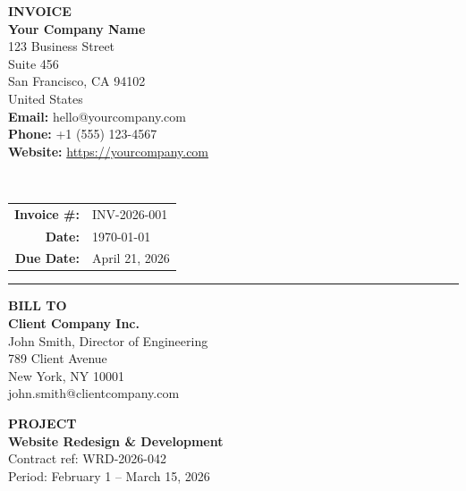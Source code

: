\documentclass[11pt,a4paper]{article}
\newcommand{\sectionline}{\vspace{4pt}\noindent\rule{\textwidth}{0.5pt}\vspace{4pt}}
\begin{document}
\begin{minipage}[t]{0.55\textwidth}
    {\Huge\textbf{\textcolor{accentblue}{INVOICE}}}\\[12pt]
    {\large\textbf{Your Company Name}}\\
    123 Business Street\\
    Suite 456\\
    San Francisco, CA 94102\\
    United States\\[6pt]
    \textbf{Email:} hello@yourcompany.com\\
    \textbf{Phone:} +1 (555) 123-4567\\
    \textbf{Website:} \url{https://yourcompany.com}
\end{minipage}%
\hfill
\begin{minipage}[t]{0.4\textwidth}
    \raggedleft
    \fbox{\parbox{3.5cm}{\centering\vspace{0.8cm}\textcolor{gray}{Your Logo}\vspace{0.8cm}}}\\[12pt]
    \begin{tabular}{rl}
        \textbf{Invoice \#:} & INV-2026-001 \\
        \textbf{Date:} & \today \\
        \textbf{Due Date:} & April 21, 2026 \\
    \end{tabular}
\end{minipage}

\sectionline

\begin{minipage}[t]{0.48\textwidth}
    \textcolor{accentblue}{\textbf{BILL TO}}\\[4pt]
    \textbf{Client Company Inc.}\\
    John Smith, Director of Engineering\\
    789 Client Avenue\\
    New York, NY 10001\\
    john.smith@clientcompany.com
\end{minipage}%
\hfill
\begin{minipage}[t]{0.48\textwidth}
    \textcolor{accentblue}{\textbf{PROJECT}}\\[4pt]
    \textbf{Website Redesign \& Development}\\
    Contract ref: WRD-2026-042\\
    Period: February 1 -- March 15, 2026
\end{minipage}
\end{document}
